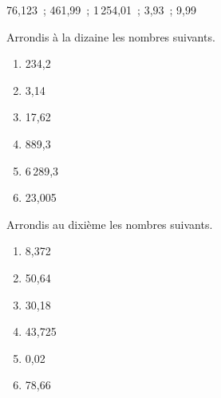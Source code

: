 \begin{exercice}
76,123 ; 461,99 ; 1\,254,01 ; 3,93 ; 9,99
\end{exercice}


\begin{exercice}
Arrondis à la dizaine les nombres suivants. 
\begin{enumerate}
 \item 234,2 \dotfill \hspace*{13em}
 
 \item 3,14 \dotfill \hspace*{13em}
 
 \item 17,62 \dotfill \hspace*{13em}
 
 \item 889,3 \dotfill \hspace*{13em}
 
 \item 6\,289,3 \dotfill \hspace*{13em}
 
 \item 23,005 \dotfill \hspace*{13em}
 
 \end{enumerate}
\end{exercice}


\begin{exercice}
Arrondis au dixième les nombres suivants.
\begin{enumerate}
 \item 8,372 \dotfill \hspace*{13em}
 
 \item 50,64 \dotfill \hspace*{13em}
 
 \item 30,18 \dotfill \hspace*{13em}
 
 \item 43,725 \dotfill \hspace*{13em}
 
 \item 0,02 \dotfill \hspace*{13em}
 
 \item 78,66 \dotfill \hspace*{13em}
 
 \end{enumerate}
\end{exercice}


